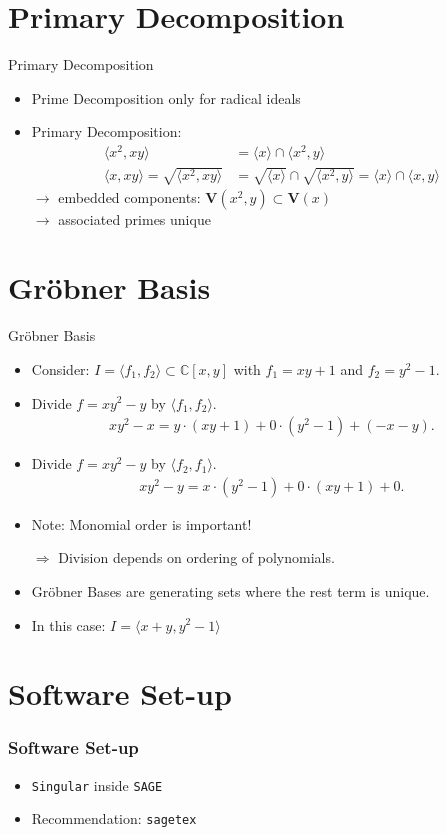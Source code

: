 \documentclass[notes=hide]{beamer}
\newcommand{\C}{\mathbb{C}}
\newcommand{\V}{\mathbf{V}}
\begin{document}
\section{Primary Decomposition}

\begin{frame}{Primary Decomposition}
\begin{itemize}[<+->]
\item Prime Decomposition only for radical ideals
\item Primary Decomposition:
\begin{align*}
\langle x^2 , xy \rangle &= \langle x \rangle \cap \langle x^2, y\rangle\\
\langle x, xy \rangle =  \sqrt{\langle x^2 , xy \rangle} &= \sqrt{\langle x \rangle} \cap\sqrt{ \langle x^2, y\rangle} = \langle x \rangle \cap \langle  x,y \rangle
\end{align*}
$\rightarrow$ embedded components: $\V (x^2,y) \subset \V (x)$\\
$\rightarrow$ associated primes unique
\end{itemize}

\end{frame}

\section{Gröbner Basis}

\begin{frame}{Gröbner Basis}
\begin{itemize}[<+->]
\item Consider: $I = \langle f_1,f_2 \rangle \subset \C [x,y]$ with $f_1 = xy+1$ and $f_2 = y^2 -1$.
\item Divide $f = xy^2-y$ by $\langle f_1, f_2 \rangle$.
\begin{align*}
xy^2-x = y \cdot (xy+1) + 0 \cdot (y^2-1) + (-x-y).
\end{align*}
\item  Divide $f = xy^2-y$ by $\langle f_2, f_1 \rangle$.
\begin{align*}
xy^2-y = x \cdot (y^2-1) + 0\cdot (xy+1) +0.
\end{align*}
\item Note: Monomial order is important!
\item[$\Rightarrow$] Division depends on ordering of polynomials.
\item Gröbner Bases are generating sets where the rest term is unique.
\item In this case: $I= \langle x+y, y^2-1\rangle$
\end{itemize}
\end{frame}


\section{Software Set-up}


\begin{frame}[fragile]
\frametitle{Software Set-up}
\begin{itemize}
\item \verb|Singular| inside \verb|SAGE|
\item Recommendation: \verb|sagetex|
\end{itemize}
\end{frame}
\end{document}
